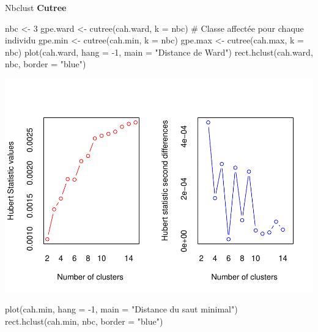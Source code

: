 \documentclass[
]{article}
\newenvironment{Shaded}{}{}
\newcommand{\AttributeTok}[1]{#1}
\newcommand{\CommentTok}[1]{\textcolor[rgb]{0.00,0.50,0.00}{#1}}
\newcommand{\DecValTok}[1]{#1}
\newcommand{\FunctionTok}[1]{#1}
\newcommand{\NormalTok}[1]{#1}
\newcommand{\OtherTok}[1]{\textcolor[rgb]{1.00,0.25,0.00}{#1}}
\newcommand{\SpecialCharTok}[1]{\textcolor[rgb]{0.00,0.50,0.50}{#1}}
\newcommand{\StringTok}[1]{\textcolor[rgb]{0.00,0.50,0.50}{#1}}
\begin{document}
Nbclust \textbf{Cutree}

\begin{Shaded}
\begin{Highlighting}[]
\NormalTok{nbc }\OtherTok{\textless{}{-}} \DecValTok{3}
\NormalTok{gpe.ward }\OtherTok{\textless{}{-}} \FunctionTok{cutree}\NormalTok{(cah.ward, }\AttributeTok{k =}\NormalTok{ nbc) }\CommentTok{\# Classe affectée pour chaque individu}
\NormalTok{gpe.min }\OtherTok{\textless{}{-}} \FunctionTok{cutree}\NormalTok{(cah.min, }\AttributeTok{k =}\NormalTok{ nbc)}
\NormalTok{gpe.max }\OtherTok{\textless{}{-}} \FunctionTok{cutree}\NormalTok{(cah.max, }\AttributeTok{k =}\NormalTok{ nbc)}
\FunctionTok{plot}\NormalTok{(cah.ward, }\AttributeTok{hang =} \SpecialCharTok{{-}}\DecValTok{1}\NormalTok{, }\AttributeTok{main =} \StringTok{"Distance de Ward"}\NormalTok{)}
\FunctionTok{rect.hclust}\NormalTok{(cah.ward, nbc, }\AttributeTok{border =} \StringTok{"blue"}\NormalTok{)}
\end{Highlighting}
\end{Shaded}

\includegraphics{projet_classification_files/figure-latex/unnamed-chunk-20-1.pdf}

\begin{Shaded}
\begin{Highlighting}[]
\FunctionTok{plot}\NormalTok{(cah.min, }\AttributeTok{hang =} \SpecialCharTok{{-}}\DecValTok{1}\NormalTok{, }\AttributeTok{main =} \StringTok{"Distance du saut minimal"}\NormalTok{)}
\FunctionTok{rect.hclust}\NormalTok{(cah.min, nbc, }\AttributeTok{border =} \StringTok{"blue"}\NormalTok{)}
\end{Highlighting}
\end{Shaded}
\end{document}
